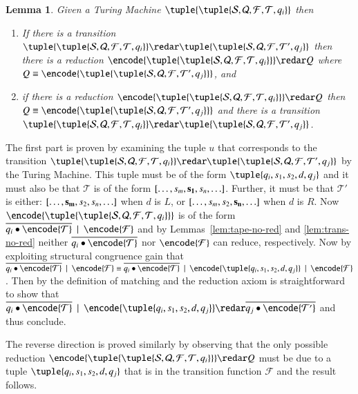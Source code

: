 \documentclass[submission,copyright,creativecommons]{eptcs}
\def\BNF{\ \  | \ \  }
\newtheorem{lemma}[theorem]{Lemma}
\newenvironment{proof}[1][Proof]{\begin{trivlist}
\item[\hskip \labelsep {\bfseries #1}]}{\end{trivlist}}
\newcommand{\oan}[1]{\overline{#1}}
\newcommand{\tmach}[1]{\tuple{\tuple{#1}}}
\newcommand{\tape}[1]{[#1]}
\begin{document}
\begin{lemma}
\label{lem:faithful}
Given a Turing Machine $\tmach{{\mathcal S}, {\mathcal Q}, {\mathcal F}, {\mathcal T}, q_i}$
then
\begin{enumerate}
\item If there is a transition
$\tmach{{\mathcal S}, {\mathcal Q}, {\mathcal F}, {\mathcal T}, q_i}\redar
\tmach{{\mathcal S}, {\mathcal Q}, {\mathcal F}, {\mathcal T}', q_j}$
then there is a reduction
$\encode{\tmach{{\mathcal S}, {\mathcal Q}, {\mathcal F}, {\mathcal T}, q_i}}\redar Q$
where $Q\equiv\encode{\tmach{{\mathcal S}, {\mathcal Q}, {\mathcal F}, {\mathcal T}', q_j}}$, and
\item if there is a reduction
$\encode{\tmach{{\mathcal S}, {\mathcal Q}, {\mathcal F}, {\mathcal T}, q_i}}\redar Q$
then $Q\equiv\encode{\tmach{{\mathcal S}, {\mathcal Q}, {\mathcal F}, {\mathcal T}', q_j}}$ and
there is a transition
$\tmach{{\mathcal S}, {\mathcal Q}, {\mathcal F}, {\mathcal T}, q_i}\redar
\tmach{{\mathcal S}, {\mathcal Q}, {\mathcal F}, {\mathcal T}', q_j}$.
\end{enumerate}
\end{lemma}
\begin{proof}
The first part is proven by examining the tuple $u$ that corresponds to the transition 
$\tmach{{\mathcal S}, {\mathcal Q}, {\mathcal F}, {\mathcal T}, q_i}\redar
\tmach{{\mathcal S}, {\mathcal Q}, {\mathcal F}, {\mathcal T}', q_j}$
by the Turing Machine. This tuple must be of the form
$\tuple{q_i,s_1,s_2,d,q_j}$ and it must also be that ${\mathcal T}$ is of the form
$\tape{\ldots,s_m,{\bf s_1},s_n,\ldots}$.
Further, it must be that ${\mathcal T}'$ is either:
$\tape{\ldots,{\bf s_m},s_2,s_n,\ldots}$ when $d$ is $L$, or
$\tape{\ldots,s_m,s_2,{\bf s_n},\ldots}$ when $d$ is $R$.
Now $\encode{\tmach{{\mathcal S}, {\mathcal Q}, {\mathcal F}, {\mathcal T}, q_i}}$
is of the form
$\oan {q_i\bullet \encode {\mathcal T}} \BNF \encode{\mathcal F}$ and
by Lemmas~\ref{lem:tape-no-red} and \ref{lem:trans-no-red} neither $\oan {q_i\bullet \encode {\mathcal T}}$
nor $\encode{\mathcal F}$ can reduce, respectively.
Now by exploiting structural congruence gain that
$\oan {q_i\bullet \encode {\mathcal T}} \BNF \encode{\mathcal F}
\equiv
\oan {q_i\bullet \encode {\mathcal T}} \BNF \encode {\tuple{q_i,s_1,s_2,d,q_j}}
\BNF \encode{\mathcal F}$.
Then by the definition of matching and the reduction axiom is straightforward to show that
$\oan {q_i\bullet \encode {\mathcal T}} \BNF \encode {\tuple{q_i,s_1,s_2,d,q_j}}\redar
 \oan {q_j\bullet \encode {{\mathcal T}'}}$ and thus conclude.

The reverse direction is proved similarly by observing that the only possible reduction
$\encode{\tmach{{\mathcal S}, {\mathcal Q}, {\mathcal F}, {\mathcal T}, q_i}}\redar Q$
must be due to a tuple $\tuple{q_i,s_1,s_2,d,q_j}$ that is in the transition function ${\mathcal F}$
and the result follows.
\end{proof}
\end{document}
